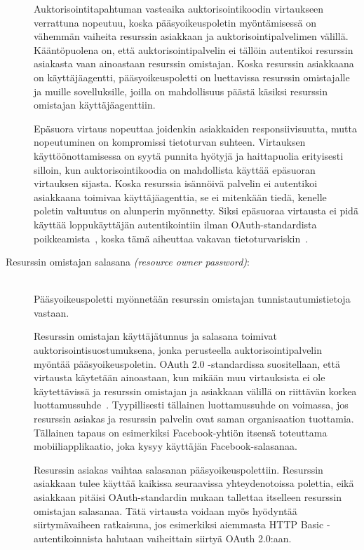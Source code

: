 \documentclass[finnish,gradu]{tktltiki}
\begin{document}
\begin{description}
  Auktorisointitapahtuman vasteaika auktorisointikoodin virtaukseen verrattuna nopeutuu, koska pääsyoikeuspoletin myöntämisessä on vähemmän vaiheita resurssin asiakkaan ja auktorisointipalvelimen välillä.  Kääntöpuolena on, että auktorisointipalvelin ei tällöin autentikoi resurssin asiakasta vaan ainoastaan resurssin omistajan. Koska resurssin asiakkaana on käyttäjäagentti, pääsyoikeuspoletti on luettavissa resurssin omistajalle ja muille sovelluksille, joilla on mahdollisuus päästä käsiksi resurssin omistajan käyttäjäagenttiin.

  Epäsuora virtaus nopeuttaa joidenkin asiakkaiden responsiivisuutta, mutta nopeutuminen on kompromissi tietoturvan suhteen. Virtauksen käyttöönottamisessa on syytä punnita hyötyjä ja haittapuolia erityisesti silloin, kun auktorisointikoodia on mahdollista käyttää epäsuoran virtauksen sijasta. Koska resurssia isännöivä palvelin ei autentikoi asiakkaana toimivaa käyttäjäagenttia, se ei mitenkään tiedä, kenelle poletin valtuutus on alunperin myönnetty. Siksi epäsuoraa virtausta ei pidä käyttää loppukäyttäjän autentikointiin ilman OAuth-standardista poikkeamista~\cite{facebook_oauth2_signed_request}, koska tämä aiheuttaa vakavan tietoturvariskin~\cite{bradley_oauth_authentication_problem_2012, bradley_oauth_implicit_flow_vulnerability_2012, sakimura_oauth_authentication_problem_2012}.


   \item[Resurssin omistajan salasana \emph{(resource owner password)}:] \hfill \\
   Pääsyoikeuspoletti myönnetään resurssin omistajan tunnistautumistietoja vastaan.

   Resurssin omistajan käyttäjätunnus ja salasana toimivat auktorisointisuostumuksena, jonka perusteella auktorisointipalvelin myöntää pääsyoikeuspoletin. OAuth 2.0 -standardissa suositellaan, että virtausta käytetään ainoastaan, kun mikään muu virtauksista ei ole käytettävissä ja resurssin omistajan ja asiakkaan välillä on riittävän korkea luottamussuhde~\cite{ietf_oauth2}. Tyypillisesti tällainen luottamussuhde on voimassa, jos resurssin asiakas ja resurssin palvelin ovat saman organisaation tuottamia. Tällainen tapaus on esimerkiksi Facebook-yhtiön itsensä toteuttama mobiiliapplikaatio, joka kysyy käyttäjän Facebook-salasanaa.

   Resurssin asiakas vaihtaa salasanan pääsyoikeuspolettiin. Resurssin asiakkaan tulee käyttää kaikissa seuraavissa yhteydenotoissa polettia, eikä asiakkaan pitäisi OAuth-standardin mukaan tallettaa itselleen resurssin omistajan salasanaa. Tätä virtausta voidaan myös hyödyntää siirtymävaiheen ratkaisuna, jos esimerkiksi aiemmasta HTTP Basic -autentikoinnista halutaan vaiheittain siirtyä OAuth 2.0:aan.


\end{description}
\end{document}
